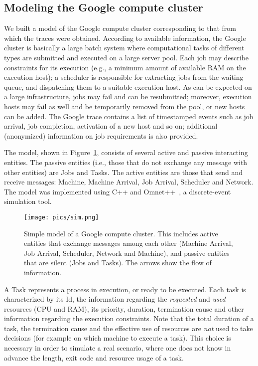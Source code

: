 \documentclass{article}
\begin{document}
\subsection{Modeling the Google compute cluster}
\label{sec:model}




We built a model of the Google compute cluster corresponding to that from which the traces were obtained. According to available information, the Google cluster is basically a large batch system where computational tasks of different types are submitted and executed on a large server pool. Each job may describe constraints for its execution (e.g., a minimum amount of available RAM on the execution host); a scheduler is responsible for extracting jobs from the waiting queue, and dispatching them to a suitable execution host. As can be expected on a large infrastructure, jobs may fail and can be resubmitted; moreover, execution hosts may fail as well and be temporarily removed from the pool, or new hosts can be added. The Google trace contains a list of timestamped events such as job arrival, job completion, activation of a new host and so on; additional (anonymized)  information on job requirements is also provided. 


The model, shown in Figure~\ref{fig:sim}, consists of several active and passive interacting entities. The passive entities (i.e., those that do not exchange any message with other entities) are Jobs and Tasks. The active entities are those that send and receive messages: Machine, Machine Arrival, Job Arrival, Scheduler and Network. The model was implemented using C++ and Omnet++~\cite{varga2001}, a discrete-event simulation tool.

\begin{figure}
\centering
  \texttt{[image: pics/sim.png]}
\caption{Simple model of a Google compute cluster. This includes active entities that exchange messages among each other (Machine Arrival, Job Arrival, Scheduler, Network and Machine), and passive entities that are silent (Jobs and Tasks). The arrows show the flow of information. }
\label{fig:sim}       
\end{figure}

A Task represents a process in execution, or ready to be executed. Each task is characterized by its Id, the information regarding the \emph{requested} and \emph{used} resources (CPU and RAM), its priority, duration, termination cause and other information regarding the execution constraints. Note that the total duration of a task, the termination cause and the effective use of resources are \emph{not} used to take decisions (for example on which machine to execute a task). This choice is necessary in order to simulate a real scenario, where one does not know in advance the length, exit code and resource usage of a task. 
\end{document}
